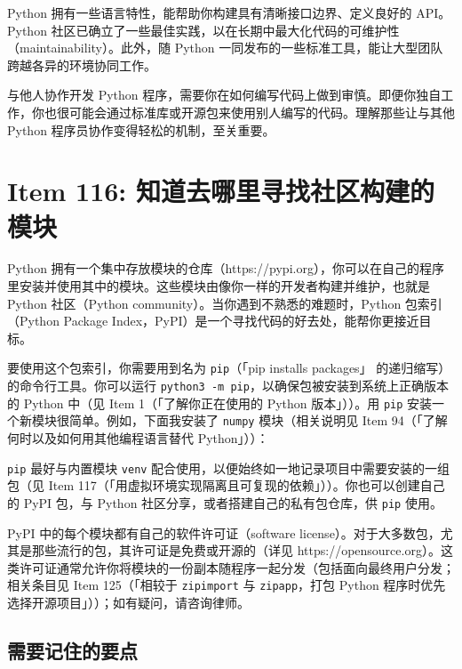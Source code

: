 Python 拥有一些语言特性，能帮助你构建具有清晰接口边界、定义良好的 API。Python 社区已确立了一些最佳实践，以在长期中最大化代码的可维护性（maintainability）。此外，随 Python 一同发布的一些标准工具，能让大型团队跨越各异的环境协同工作。

与他人协作开发 Python 程序，需要你在如何编写代码上做到审慎。即便你独自工作，你也很可能会通过标准库或开源包来使用别人编写的代码。理解那些让与其他 Python 程序员协作变得轻松的机制，至关重要。

\section{Item 116: 知道去哪里寻找社区构建的模块}

Python 拥有一个集中存放模块的仓库（https://pypi.org），你可以在自己的程序里安装并使用其中的模块。这些模块由像你一样的开发者构建并维护，也就是 Python 社区（Python community）。当你遇到不熟悉的难题时，Python 包索引（Python Package Index，PyPI）是一个寻找代码的好去处，能帮你更接近目标。

要使用这个包索引，你需要用到名为 \texttt{pip}（「pip installs packages」 的递归缩写）的命令行工具。你可以运行 \texttt{python3 -m pip}，以确保包被安装到系统上正确版本的 Python 中（见 Item 1（「了解你正在使用的 Python 版本」））。用 \texttt{pip} 安装一个新模块很简单。例如，下面我安装了 \texttt{numpy} 模块（相关说明见 Item 94（「了解何时以及如何用其他编程语言替代 Python」））：


\texttt{pip} 最好与内置模块 \texttt{venv} 配合使用，以便始终如一地记录项目中需要安装的一组包（见 Item 117（「用虚拟环境实现隔离且可复现的依赖」））。你也可以创建自己的 PyPI 包，与 Python 社区分享，或者搭建自己的私有包仓库，供 \texttt{pip} 使用。

PyPI 中的每个模块都有自己的软件许可证（software license）。对于大多数包，尤其是那些流行的包，其许可证是免费或开源的（详见 https://opensource.org）。这类许可证通常允许你将模块的一份副本随程序一起分发（包括面向最终用户分发；相关条目见 Item 125（「相较于 \texttt{zipimport} 与 \texttt{zipapp}，打包 Python 程序时优先选择开源项目」））；如有疑问，请咨询律师。

\subsection{需要记住的要点}

